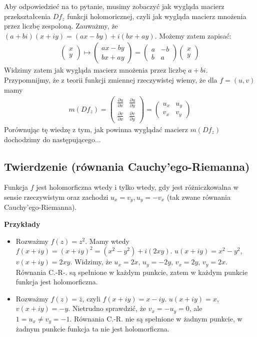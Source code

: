 Aby odpowiedzieć na to pytanie, musimy zobaczyć jak wygląda macierz przekształcenia $Df_z$ funkcji holomoricznej, czyli jak wygląda macierz mnożenia przez liczbę zespoloną. Zauważmy, że $(a+bi)(x+iy) = (ax-by) + i(bx+ay)$. Możemy zatem zapisać:
\begin{align*}
	\begin{pmatrix}
		x \\
		y
	\end{pmatrix} 
	\mapsto 
	\begin{pmatrix}
		ax-by \\
		bx+ay
	\end{pmatrix}
	=
	\begin{pmatrix}
		a & -b \\
		b & a
	\end{pmatrix}
	\begin{pmatrix}
		x \\
		y
	\end{pmatrix}
\end{align*}
Widzimy zatem jak wygląda macierz mnożenia przez liczbę $a+bi$. Przypomnijmy, że z teorii funkcji zmiennej rzeczywistej wiemy, że dla $f = (u,v)$ mamy
\begin{align*}
	m(Df_z) = 
	\begin{pmatrix}
		\frac{\partial u}{\partial x} & \frac{\partial u}{\partial y} \\
		\frac{\partial v}{\partial x} & \frac{\partial v}{\partial y}
	\end{pmatrix}
	=
	\begin{pmatrix}
		u_x & u_y \\
		v_x & v_y
	\end{pmatrix}
\end{align*}
Porównując tę wiedzę z tym, jak powinna wyglądać macierz $m(Df_z)$ dochodzimy do następującego...

\subsection{Twierdzenie (równania Cauchy'ego-Riemanna)}
Funkcja $f$ jest holomorficzna wtedy i tylko wtedy, gdy jest różniczkowalna w sensie rzeczywistym oraz zachodzi $u_x = v_y, u_y = -v_x$ (tak zwane równania Cauchy'ego-Riemanna).

\textbf{Przykłady}
\begin{itemize}
	\item Rozważmy $f(z) = z^2$. Mamy wtedy $f(x+iy) = (x+iy)^2 = (x^2-y^2) + i(2xy)$. $u(x+iy) = x^2-y^2$, $v(x+iy)=2xy$. Widzimy, że $u_x = 2x$, $u_y = -2y$, $v_x = 2y$, $v_y = 2x$. Równania C.-R-. są spełnione w każdym punkcie, zatem w każdym punkcie funkcja jest holomorficzna.
	
	\item Rozważmy $f(z) = \bar{z}$, czyli $f(x+iy) = x-iy$. $u(x+iy) = x$, $v(x+iy) = -y$. Nietrudno sprawdzić, że $v_x = -u_y = 0$, ale $1 = u_x \neq v_y = -1$. Równania C.-R. nie są spełnione w żadnym punkcie, w żadnym punkcie funkcja ta nie jest holomorficzna.
\end{itemize}

